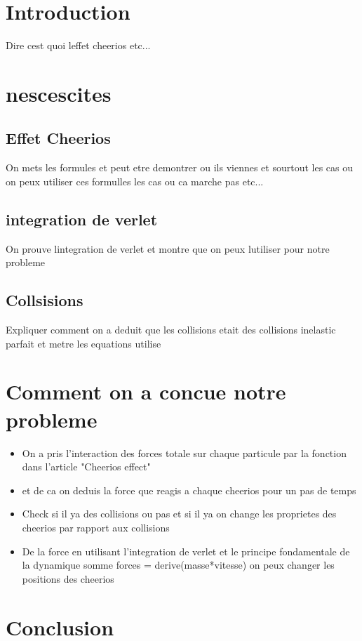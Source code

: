 \documentclass[a4paper, 11pt, oneside]{article} %
\begin{document}
 

\newpage
\section{Introduction}
    Dire cest quoi leffet cheerios etc...

\section{nescescites}
    \subsection{Effet Cheerios}
    On mets les formules et peut etre demontrer ou ils viennes et sourtout les cas ou on peux utiliser ces formulles les cas ou ca marche pas etc...
    \subsection{integration de verlet}
    On prouve lintegration de verlet et montre que on peux lutiliser pour notre probleme
    \subsection{Collsisions}
    Expliquer comment on a deduit que les collisions etait des collisions inelastic parfait et metre les equations utilise

\section{Comment on a concue notre probleme}
    \begin{itemize}
        \item On a pris l'interaction des forces totale sur chaque particule par la fonction dans l'article "Cheerios effect"
        \item et de ca on deduis la force que reagis a chaque cheerios pour un pas de temps 
        \item Check si il ya des collisions ou pas et si il ya on change les proprietes des cheerios par rapport aux collisions
        \item De la force en utilisant l'integration de verlet et le principe fondamentale de la dynamique somme forces = derive(masse*vitesse) on peux changer les positions des cheerios
    \end{itemize}
\section{Conclusion}
\end{document}
